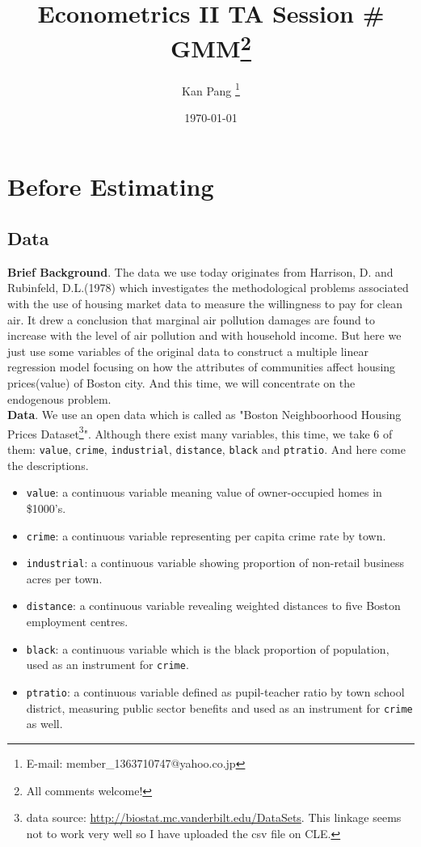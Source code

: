 \documentclass{article}
\title{Econometrics II TA Session \# GMM\thanks{All comments welcome!}}
\author{Kan Pang \thanks{E-mail: member\_1363710747@yahoo.co.jp}}
\date{\today}
\theoremstyle{definition}
\providecommand{\tightlist}{%
	\setlength{\itemsep}{0pt}\setlength{\parskip}{0pt}}
\begin{document}
\maketitle
	
\tableofcontents
	
\newpage

\section{Before Estimating}

\subsection{Data}
\noindent\textbf{Brief Background}. The data we use today originates from Harrison, D. and Rubinfeld, D.L.(1978)\cite{Boston} which investigates the methodological problems associated with the use of housing market data to measure the willingness to pay for clean air. It drew a conclusion that marginal air pollution damages are found to increase with the level of air pollution and with household income. But here we just use some variables of the original data to construct a multiple linear regression model focusing on how the attributes of communities affect housing prices(value) of Boston city. And this time, we will concentrate on the endogenous problem.\\

\noindent \textbf{Data}. We use an open data which is called as "Boston Neighboorhood Housing Prices Dataset\footnote{data source: \url{http://biostat.mc.vanderbilt.edu/DataSets}. This linkage seems not to work very well so I have uploaded the csv file on CLE.}". Although there exist many variables, this time, we take 6 of them: \texttt{value}, \texttt{crime}, \texttt{industrial}, \texttt{distance}, \texttt{black} and \texttt{ptratio}. And here come the descriptions.\\

\begin{itemize}
	\tightlist
	\item
	\texttt{value}: a continuous variable meaning value of owner-occupied homes in \$1000's.
	\item
	\texttt{crime}: a continuous variable representing per capita crime rate by town.
	\item
	\texttt{industrial}: a continuous variable showing proportion of non-retail business acres per town.
	\item
	\texttt{distance}: a continuous variable revealing weighted distances to five Boston employment centres.
	\item
	\texttt{black}: a continuous variable which is the black proportion of population, used as an instrument for \texttt{crime}.
	\item
	\texttt{ptratio}: a continuous variable defined as pupil-teacher ratio by town school district, measuring public sector benefits and used as an instrument for \texttt{crime} as well.
\end{itemize}
\end{document}
